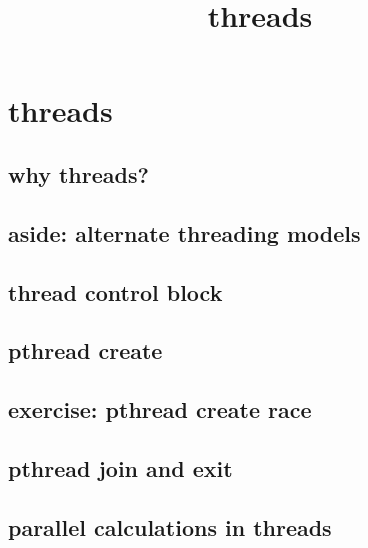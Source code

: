 \graphicspath{{./figures/}}
\title{threads}
\date{}

\begin{frame}
    \titlepage
\end{frame}

\section{threads}

\subsection{why threads?}



\subsection{aside: alternate threading models}



\subsection{thread control block}



\subsection{pthread create}



\subsection{exercise: pthread create race}



\subsection{pthread join and exit}



\subsection{parallel calculations in threads}


